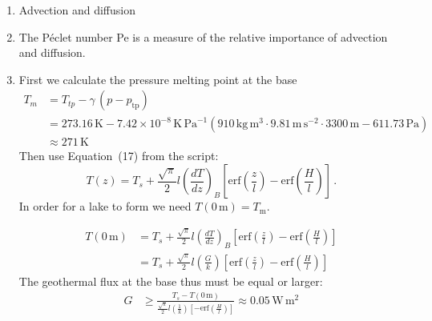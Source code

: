 \documentclass[DIV15,11pt,parskip=half]{scrartcl}
\begin{document}
\begin{enumerate}
\item Advection and diffusion
\item The P\'eclet number Pe is a measure of the relative importance of advection and diffusion.
\item First we calculate the pressure melting point at the base
\begin{align*}
 \label{eq:clausius-pure}
 T_m &= T_{tp} - \gamma\, (p - p_{\mathrm{tp}}) \\
 & = 273.16\,\mathrm{K} -  7.42 \times 10^{-8} \,\mathrm{K}\,\mathrm{Pa}^{-1} \left(  910\,\mathrm{kg}\,\mathrm{m}^{3} \cdot 9.81\,\mathrm{m}\,\mathrm{s}^{-2}\cdot 3300\,\mathrm{m}- 611.73\,\mathrm{Pa}\right) \\
 & \approx 271\,\mathrm{K}
\end{align*} Then use Equation~(17) from the script:
\begin{equation*}
  T(z) = T_s + \frac{\sqrt\pi}{2} l \left(\frac{dT}{dz}\right)_{B} 
 \left[ {\textrm{erf}} \left( \frac{z}{l} \right) - {\textrm{erf}} \left( \frac{H}{l} \right) \right]\,.
\end{equation*} In order for a lake to form we need $T(0\,\mathrm{m}) = T_{\mathrm{m}}$.

\begin{align*}
  T(0\,\mathrm{m}) & = T_s + \frac{\sqrt\pi}{2} l \left(\frac{dT}{dz}\right)_{B} 
 \left[ {\textrm{erf}} \left( \frac{z}{l} \right) - {\textrm{erf}} \left( \frac{H}{l} \right) \right] \\
 & = T_s + \frac{\sqrt\pi}{2} l \left(\frac{G}{k}\right) 
 \left[ {\textrm{erf}} \left( \frac{z}{l} \right) - {\textrm{erf}} \left( \frac{H}{l} \right) \right]
\end{align*}
The geothermal flux at the base thus must be equal or larger:
\begin{align*}
 G & \ge \frac{T_s - T(0\,\mathrm{m})}{\frac{\sqrt\pi}{2} l \left(\frac{1}{k}\right) 
 \left[  - {\textrm{erf}} \left( \frac{H}{l} \right) \right]} \approx 0.05\,\mathrm{W}\,\mathrm{m}^{2}
\end{align*}


\end{enumerate}
\end{document}
